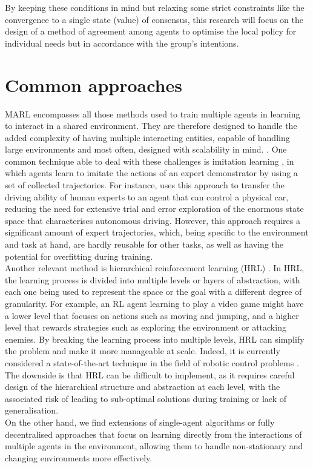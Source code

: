 \documentclass[a4paper,singleside,12pt]{report} %
\begin{document}
By keeping these conditions in mind but relaxing some strict constraints like the convergence to a single state (value) of consensus, this research will focus on the design of a method of agreement among agents to optimise the local policy for individual needs but in accordance with the group's intentions.


\section{Common approaches}\label{common-approaches}
MARL encompasses all those methods used to train multiple agents in learning to interact in a shared environment. They are therefore designed to handle the added complexity of having multiple interacting entities, capable of handling large environments and most often, designed with scalability in mind. \cite{Gronauer2021MultiagentDR, HernandezLeal2019ASA, Stone2022ASO}. One common technique able to deal with these challenges is imitation learning \cite{ACM2018ImitationLearningSurvey}, in which agents learn to imitate the actions of an expert demonstrator by using a set of collected trajectories. For instance, \cite{Osinski2019SimulationBasedRL, Maramotti2022TacklingRA} uses this approach to transfer the driving ability of human experts to an agent that can control a physical car, reducing the need for extensive trial and error exploration of the enormous state space that characterises autonomous driving. However, this approach requires a significant amount of expert trajectories, which, being specific to the environment and task at hand, are hardly reusable for other tasks, as well as having the potential for overfitting during training.\\
Another relevant method is hierarchical reinforcement learning (HRL) \cite{MLKE2022HRLSurvey}. In HRL, the learning process is divided into multiple levels or layers of abstraction, with each one being used to represent the space or the goal with a different degree of granularity. For example, an RL agent learning to play a video game might have a lower level that focuses on actions such as moving and jumping, and a higher level that rewards strategies such as exploring the environment or attacking enemies. By breaking the learning process into multiple levels, HRL can simplify the problem and make it more manageable at scale. Indeed, it is currently considered a state-of-the-art technique in the field of robotic control problems \cite{Nachum2018DataEfficientHR}. The downside is that HRL can be difficult to implement, as it requires careful design of the hierarchical structure and abstraction at each level, with the associated risk of leading to sub-optimal solutions during training or lack of generalisation.\\
On the other hand, we find extensions of single-agent algorithms or fully decentralised approaches that focus on learning directly from the interactions of multiple agents in the environment, allowing them to handle non-stationary and changing environments more effectively.
\end{document}
